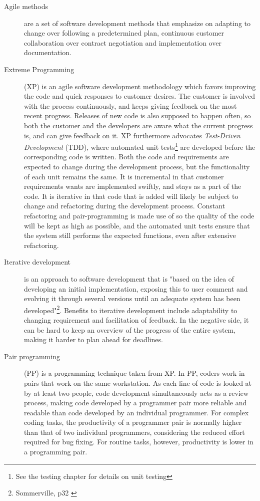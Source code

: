 \begin{description}

\item[Agile methods] \label{def:agile} are a set of software development methods that emphasize on adapting to change over following a predetermined plan, continuous customer collaboration over contract negotiation and implementation over documentation.

\item[Extreme Programming] (XP) is an agile software development methodology which favors improving the code and quick responses to customer desires. The customer is involved with the process continuously, and keeps giving feedback on the most recent progress. Releases of new code is also supposed to happen often, so both the customer and the developers are aware what the current progress is, and can give feedback on it. XP furthermore advocates \emph{Test-Driven Development} (TDD), where automated unit tests\footnote{See the testing chapter for details on unit testing} are developed before the corresponding code is written. Both the code and requirements are expected to change during the development process, but the functionality of each unit remains the same. It is incremental in that customer requirements wants are implemented swiftly, and stays as a part of the code. It is iterative in that code that is added will likely be subject to change and refactoring during the development process. Constant refactoring and pair-programming is made use of so the quality of the code will be kept as high as possible, and the automated unit tests ensure that the system still performs the expected functions, even after extensive refactoring. 

\item[Iterative development] \label{def:incrementalDev} is an approach to software development that is "based on the idea of developing an initial implementation, exposing this to user comment and evolving it through several versions until an adequate system has been developed"\footnote{Sommerville, p32 \cite{sommerville}}. Benefits to iterative development include adaptability to changing requirement and facilitation of feedback. In the negative side, it can be hard to keep an overview of the progress of the entire system, making it harder to plan ahead for deadlines.

\item[Pair programming](PP) \label{def:pairprogram} is a programming technique taken from XP. In PP, coders work in pairs that work on the same workstation. As each line of code is looked at by at least two people, code development simultaneously acts as a review process, making code developed by a programmer pair more reliable and readable than code developed by an individual programmer. For complex coding tasks, the productivity of a programmer pair is normally higher than that of two individual programmers, considering the reduced effort required for bug fixing. For routine tasks, however, productivity is lower in a programming pair.


\end{description}
